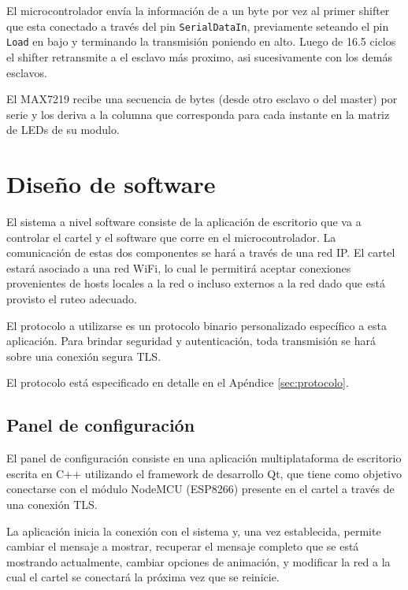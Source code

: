El microcontrolador envía la información de a un byte por vez al primer shifter que esta conectado a través del pin \texttt{SerialDataIn}, previamente seteando el pin \texttt{Load} en bajo y terminando la transmisión poniendo en alto. Luego de 16.5 ciclos el shifter retransmite a el esclavo más proximo, asi sucesivamente con los demás esclavos.

El MAX7219 recibe una secuencia de bytes (desde otro esclavo o del master) por serie y los deriva a la columna que corresponda para cada instante en la matriz de LEDs de su modulo.

\section{Diseño de software}
El sistema a nivel software consiste de la aplicación de escritorio que va a controlar el cartel y el software que corre en el microcontrolador.
La comunicación de estas dos componentes se hará a través de una red IP. El cartel estará asociado a una red WiFi, lo cual le permitirá aceptar conexiones provenientes de hosts locales a la red o incluso externos a la red dado que está provisto el ruteo adecuado. 

El protocolo a utilizarse es un protocolo binario personalizado específico a esta aplicación. Para brindar seguridad y autenticación, toda transmisión se hará sobre una conexión segura TLS. 

El protocolo está especificado en detalle en el Apéndice \ref{sec:protocolo}.

\subsection{Panel de configuración}
El panel de configuración consiste en una aplicación multiplataforma de escritorio escrita en C++ utilizando el framework de desarrollo Qt, que tiene como objetivo conectarse con el módulo NodeMCU (ESP8266) presente en el cartel a través de una conexión TLS.

La aplicación inicia la conexión con el sistema y, una vez establecida, permite cambiar el mensaje a mostrar, recuperar el mensaje completo que se está mostrando actualmente, cambiar opciones de animación, y modificar la red a la cual el cartel se conectará la próxima vez que se reinicie.


